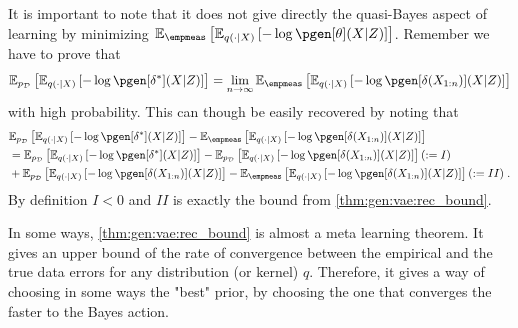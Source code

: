 \begin{remark}
    It is important to note that it does not give directly the quasi-Bayes aspect of learning by minimizing $\PE{\empmeas}{\PE{q(\cdot | \state)}{ - \log \pgen[\param](\state | Z)}}$.
    Remember we have to prove that
    \[
        \PE{\pdata}{\PE{q(\cdot | \state)}{ - \log \pgen[\tmin{\decfun}](\state | Z)}} = \lim_{n \rightarrow \infty} \PE{\empmeas}{\PE{q(\cdot | \state)}{ - \log \pgen[\decfun(\chunk{\state}{1}{n})](\state | Z)}}
    \] with high probability.
    This can though be easily recovered by noting that
    \begin{align*}
        &\PE{\pdata}{\PE{q(\cdot | \state)}{ - \log \pgen[\tmin{\decfun}](\state | Z)}} - \PE{\empmeas}{\PE{q(\cdot | \state)}{ - \log \pgen[\decfun(\chunk{\state}{1}{n})](\state | Z)}} \\
        &= \PE{\pdata}{\PE{q(\cdot | \state)}{ - \log \pgen[\tmin{\decfun}](\state | Z)}} -  \PE{\pdata}{\PE{q(\cdot | \state)}{ - \log \pgen[\decfun(\chunk{\state}{1}{n})](\state | Z)}} (\eqdef I) \\
        &+ \PE{\pdata}{\PE{q(\cdot | \state)}{ - \log \pgen[\decfun(\chunk{\state}{1}{n})](\state | Z)}} - \PE{\empmeas}{\PE{q(\cdot | \state)}{ - \log \pgen[\decfun(\chunk{\state}{1}{n})](\state | Z)}} (\eqdef II) \eqsp.
    \end{align*}
    By definition $I<0$ and $II$ is exactly the bound from \cref{thm:gen:vae:rec_bound}.
\end{remark}

In some ways, \cref{thm:gen:vae:rec_bound} is almost a meta learning theorem. It gives an upper bound of the rate of convergence between the empirical and the true data errors
for any distribution (or kernel) $q$.  Therefore, it gives a way of choosing in some ways the "best" prior, by choosing the one that converges the faster to the Bayes action.

